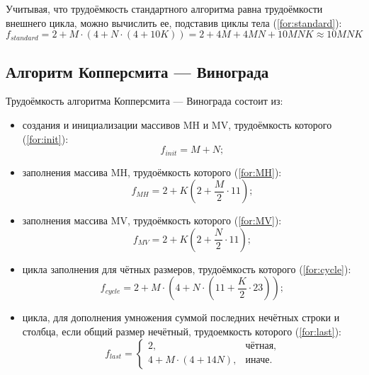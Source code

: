 Учитывая, что трудоёмкость стандартного алгоритма равна трудоёмкости внешнего цикла, можно вычислить ее, подставив циклы тела (\ref{for:standard}):
\begin{equation}
	\label{for:standard}
	f_{standard} = 2 + M \cdot (4 + N \cdot (4 + 10K)) = 2 + 4M + 4MN + 10MNK \approx 10MNK
\end{equation}

\subsection{Алгоритм Копперсмита — Винограда}

Трудоёмкость алгоритма Копперсмита — Винограда состоит из:
\begin{itemize}
	\item создания и инициализации массивов MH и MV, трудоёмкость которого (\ref{for:init}):
	\begin{equation}
		\label{for:init}
		f_{init} = M + N;
	\end{equation}
	
	\item заполнения массива MH, трудоёмкость которого (\ref{for:MH}):
	\begin{equation}
		\label{for:MH}
		f_{MH} = 2 + K (2 + \frac{M}{2} \cdot 11);
	\end{equation}
	
	\item заполнения массива MV, трудоёмкость которого (\ref{for:MV}):
	\begin{equation}
		\label{for:MV}
		f_{MV} = 2 + K (2 + \frac{N}{2} \cdot 11);
	\end{equation}
	
	\item цикла заполнения для чётных размеров, трудоёмкость которого (\ref{for:cycle}):
	\begin{equation}
		\label{for:cycle}
		f_{cycle} = 2 + M \cdot (4 + N \cdot (11 + \frac{K}{2} \cdot 23));
	\end{equation}
	
	\item цикла, для дополнения умножения суммой последних нечётных строки и столбца, если общий размер нечётный, трудоемкость которого (\ref{for:last}):
	\begin{equation}
		\label{for:last}
		f_{last} = \begin{cases}
			2, & \text{чётная,}\\
			4 + M \cdot (4 + 14N), & \text{иначе.}
		\end{cases}
	\end{equation}
\end{itemize}

